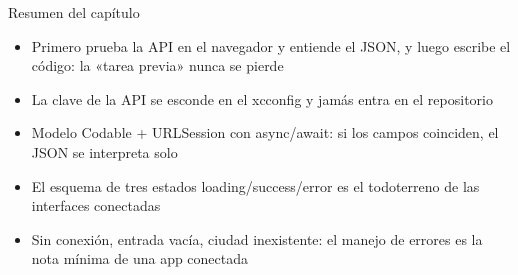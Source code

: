 \begin{tcbsummary}{Resumen del capítulo}
\begin{itemize}
  \item Primero prueba la API en el navegador y entiende el JSON, y luego escribe el código: la «tarea previa» nunca se pierde
  \item La clave de la API se esconde en el xcconfig y jamás entra en el repositorio
  \item Modelo Codable + URLSession con async/await: si los campos coinciden, el JSON se interpreta solo
  \item El esquema de tres estados loading/success/error es el todoterreno de las interfaces conectadas
  \item Sin conexión, entrada vacía, ciudad inexistente: el manejo de errores es la nota mínima de una app conectada
\end{itemize}

\end{tcbsummary}
